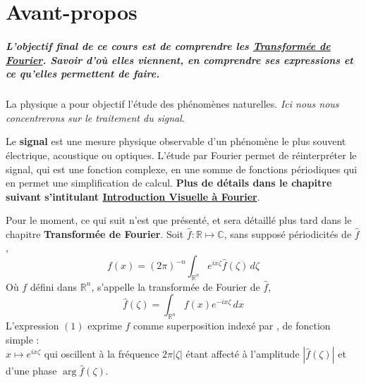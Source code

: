 \documentclass[a4paper]{book}
\date{}
\newcommand\BackgroundPic{%
	\put(0,0){%
		\parbox[b][\paperheight]{\paperwidth}{%
			\vfill
			\centering
			\texttt{[image: background.png]}%
			\vfill
		}
	}
}
\begin{document}
\AddToShipoutPicture*{\BackgroundPic}
\maketitle
\clearpage

\tableofcontents


\chapter{Avant-propos}
\paragraph{L'objectif final de ce cours est de comprendre les \underline{Transformée de
Fourier}. Savoir d'où elles viennent, en comprendre ses expressions et ce
qu'elles permettent de faire.}

\newline
La physique a pour objectif l'étude des phénomènes naturelles. \emph{Ici nous nous
concentrerons sur le traitement du signal}.

Le \textbf{signal} est une mesure physique observable d'un phénomène le plus
souvent électrique, acoustique ou optiques. L'étude par Fourier permet de
réinterpréter le signal, qui est une fonction complexe, en une somme de
fonctions périodiques qui en permet une simplification de calcul. \textbf{Plus
de détails dans le chapitre suivant s'intitulant \underline{Introduction
Visuelle à Fourier}}.

\newline
\vspace{5mm}
Pour le moment, ce qui suit n'est que présenté, et sera détaillé plus tard dans
le chapitre \textbf{Transformée de Fourier}.
Soit $\hat{f} : \mathbb{R} \mapsto \mathbb{C}$, sans supposé périodicités de
$\hat{f}$,
\begin{equation}
	f(x) = (2\pi)^{-n} \int_{\mathbb{R}^n} e^{ix\zeta}\hat{f}(\zeta) \, d\zeta
\end{equation}
Où $f$ défini dans $\mathbb{R}^n$, s'appelle la transformée de Fourier de
$\hat{f}$,
\begin{equation}
	\hat{f}(\zeta) = \int_{\mathbb{R}^n} f(x) e^{-ix\zeta} \, dx
\end{equation}
L'expression $(1)$ exprime $\hat{f}$ comme superposition indexé par \zeta, de
fonction simple : \\
$x \mapsto e^{ix\zeta}$ qui oscillent à la fréquence $2\pi|\zeta|$ étant affecté
à l'amplitude $|\hat{f}(\zeta)|$ et d'une phase $\arg{\hat{f}(\zeta)}$.
\end{document}
